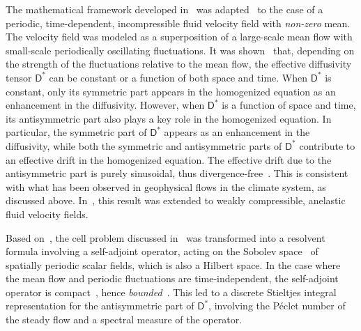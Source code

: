 \documentclass[leqno,onefignum,onetabnum]{siamltex1213}
\newcommand{\Dm}{\mathsf{D}}
\begin{document}
The mathematical framework developed in~\cite{McLaughlin:SIAM_JAM:780}
was
adapted~\cite{Pavliotis:PHD_Thesis,McLaughlin:Forest:PF:1999:880,Majda:Kramer:1999:book} 
to the case of a periodic, 
time-dependent, incompressible fluid velocity field with \emph{non-zero}
mean. The velocity field was modeled as a superposition of a
large-scale mean flow with small-scale periodically oscillating 
fluctuations. It was shown~\cite{Pavliotis:PHD_Thesis} that, depending
on the strength of the fluctuations relative to the mean flow, the
effective diffusivity tensor $\Dm^*$ can be constant or a function of
both space and time. When $\Dm^*$ is constant, only its symmetric part
appears in the homogenized equation as an enhancement in the
diffusivity. However, when $\Dm^*$ is a function of space and time,
its antisymmetric part also plays a key role in the homogenized
equation. In particular, the symmetric part of $\Dm^*$ appears as an
enhancement in the diffusivity, while both the symmetric and
antisymmetric parts of $\Dm^*$ contribute to an effective drift in the
homogenized equation. The effective drift due to the antisymmetric
part is purely sinusoidal, thus
divergence-free~\cite{Pavliotis:PHD_Thesis}. This is consistent with
what has been observed in geophysical flows in the climate system, as
discussed above. In~\cite{McLaughlin:Forest:PF:1999:880}, this result
was extended to weakly compressible, anelastic fluid velocity
fields. 


Based on~\cite{Bhattacharya:AAP:1999:951}, the cell problem discussed
in~\cite{Pavliotis:PHD_Thesis} was transformed into a resolvent formula
involving a self-adjoint operator, acting on the Sobolev
space~\cite{McOwen:2003:PDE,Folland:95:PDEs} of spatially periodic scalar
fields, which is also a Hilbert space. In the case where the mean flow
and periodic fluctuations are time-independent, the
self-adjoint operator is compact~\cite{Bhattacharya:AAP:1999:951},
hence \emph{bounded}~\cite{Stakgold:BVP:2000}. This led to a
discrete Stieltjes integral representation for the
antisymmetric part of $\Dm^*$, involving the P{\'e}clet number of the
steady flow and a spectral measure of the operator.    
\end{document}
